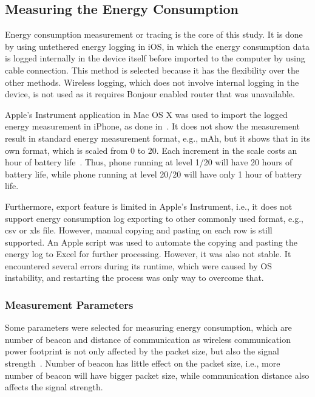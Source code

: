 \documentclass[journal]{vgtc}                %
\begin{document}
\subsection{Measuring the Energy Consumption} %
\label{sub:tracing_}
Energy consumption measurement or tracing is the core of this study. It is done by using untethered energy logging in iOS, in which the energy consumption data is logged internally in the device itself before imported to the computer by using cable connection. This method is selected because it has the flexibility over the other methods. Wireless logging, which does not involve internal logging in the device, is not used as it requires Bonjour enabled router that was unavailable.

Apple's Instrument application in Mac OS X was used to import the logged energy measurement in iPhone, as done in~\cite{Conte2014}. It does not show the measurement result in standard energy measurement format, e.g., mAh, but it shows that in its own format, which is scaled from 0 to 20. Each increment in the scale costs an hour of battery life~\cite{Lucchesi2014}. Thus, phone running at level 1/20 will have 20 hours of battery life, while phone running at level 20/20 will have only 1 hour of battery life.

Furthermore, export feature is limited in Apple's Instrument, i.e., it does not support energy consumption log exporting to other commonly used format, e.g., csv or xls file. However, manual copying and pasting on each row is still supported. An Apple script was used to automate the copying and pasting the energy log to Excel for further processing. However, it was also not stable. It encountered several errors during its runtime, which were caused by OS instability, and restarting the process was only way to overcome that.

\subsubsection{Measurement Parameters} %
\label{ssub:measurement_parameters}
Some parameters were selected for measuring energy consumption, which are number of beacon and distance of communication as wireless communication power footprint is not only affected by the packet size, but also the signal strength~\cite{Vergara2012}. Number of beacon has little effect on the packet size, i.e., more number of beacon will have bigger packet size, while communication distance also affects the signal strength.
\end{document}
